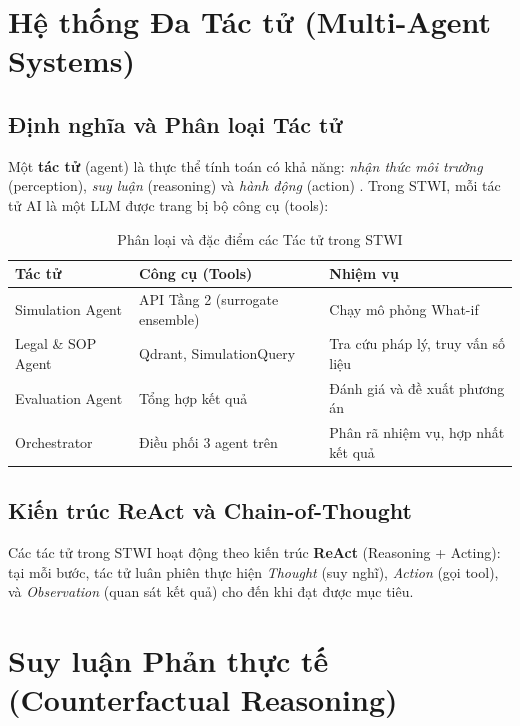 \section{Hệ thống Đa Tác tử (Multi-Agent Systems)}

\subsection{Định nghĩa và Phân loại Tác tử}

Một \textbf{tác tử} (agent) là thực thể tính toán có khả năng: \textit{nhận thức môi trường} (perception), \textit{suy luận} (reasoning) và \textit{hành động} (action) \cite{wooldridge2009multiagent}. Trong STWI, mỗi tác tử AI là một LLM được trang bị bộ công cụ (tools):

\begin{table}[H]
\centering
\caption{Phân loại và đặc điểm các Tác tử trong STWI}
\label{tab:agents}
\renewcommand{\arraystretch}{1.4}
\begin{tabular}{p{3.5cm} p{3.5cm} p{5.5cm}}
\toprule
\textbf{Tác tử} & \textbf{Công cụ (Tools)} & \textbf{Nhiệm vụ} \\
\midrule
Simulation Agent & API Tầng 2 (surrogate ensemble) & Chạy mô phỏng What-if \\
\rowcolor{rowgray}
Legal \& SOP Agent & Qdrant, SimulationQuery & Tra cứu pháp lý, truy vấn số liệu \\
Evaluation Agent & Tổng hợp kết quả & Đánh giá và đề xuất phương án \\
\rowcolor{rowgray}
Orchestrator & Điều phối 3 agent trên & Phân rã nhiệm vụ, hợp nhất kết quả \\
\bottomrule
\end{tabular}
\end{table}

\subsection{Kiến trúc ReAct và Chain-of-Thought}

Các tác tử trong STWI hoạt động theo kiến trúc \textbf{ReAct} (Reasoning + Acting): tại mỗi bước, tác tử luân phiên thực hiện \textit{Thought} (suy nghĩ), \textit{Action} (gọi tool), và \textit{Observation} (quan sát kết quả) cho đến khi đạt được mục tiêu.

\section{Suy luận Phản thực tế (Counterfactual Reasoning)}

